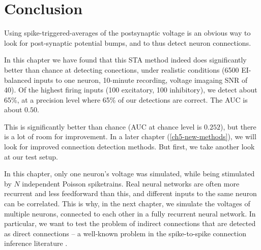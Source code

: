\FloatBarrier
\section{Conclusion}

Using spike-triggered-averages of the postsynaptic voltage is an obvious way to look for post-synaptic potential bumps, and to thus detect neuron connections.

In this chapter we have found that this STA method indeed does significantly better than chance at detecting conections, under realistic conditions (6500 EI-balanced inputs to one neuron, 10-minute recording, voltage imagaing SNR of 40).
Of the highest firing inputs (100 excitatory, 100 inhibitory), we detect about 65\%, at a precision level where 65\% of our detections are correct. The AUC is about $0.50$.


This is significantly better than chance (AUC at chance level is $0.252$), but there is a lot of room for improvement. In a later chapter (\cref{ch5-new-methods}), we will look for improved connection detection methods. But first, we take another look at our test setup.

In this chapter, only one neuron's voltage was simulated, while being stimulated by $N$ independent Poisson spiketrains. Real neural networks are often more recurrent and less feedforward than this, and different inputs to the same neuron can be correlated. This is why, in the next chapter, we simulate the voltages of multiple neurons, connected to each other in a fully recurrent neural network. In particular, we want to test the problem of indirect connections that are detected as direct connections -- a well-known problem in the spike-to-spike connection inference literature \cite{Orlandi2017FirstConnectomicsChallenge,Das2020SystematicErrorsConnectivity}.
